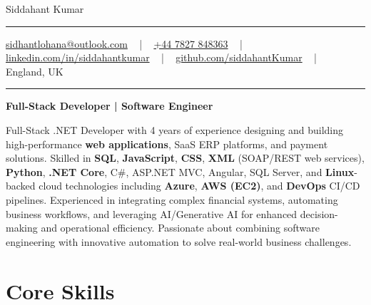 \documentclass[letterpaper,10pt]{article}
\newcommand{\documentTitle}[2]{
  \begin{center}
    \vspace*{-0.3in}
    {\Huge\color{accentTitle} #1}
    \vspace{8pt}
    {\color{accentLine} \hrule}
    \vspace{2pt}
    \footnotesize{#2}
    \vspace{2pt}
    {\color{accentLine} \hrule}
  \end{center}
}
\begin{document}
\documentTitle{Siddahant Kumar}{
\vspace{0.1cm}
\href{mailto:sidhantlohana@outlook.com}{sidhantlohana@outlook.com} ~ | ~
\href{tel:+447827848363}{+44 7827 848363} ~ | ~
\href{https://www.linkedin.com/in/siddahantkumar/}{linkedin.com/in/siddahantkumar} ~ | ~
\href{https://github.com/siddahantKumar}{github.com/siddahantKumar} ~ | ~
England, UK
}

\begin{center}
\textbf{Full-Stack Developer | Software Engineer}
\end{center}

Full-Stack .NET Developer with 4 years of experience designing and building high-performance \textbf{web applications}, SaaS ERP platforms, and payment solutions. Skilled in \textbf{SQL}, \textbf{JavaScript}, \textbf{CSS}, \textbf{XML} (SOAP/REST web services), \textbf{Python}, \textbf{.NET Core}, C\#, ASP.NET MVC, Angular, SQL Server, and \textbf{Linux}-backed cloud technologies including \textbf{Azure}, \textbf{AWS (EC2)}, and \textbf{DevOps} CI/CD pipelines. Experienced in integrating complex financial systems, automating business workflows, and leveraging AI/Generative AI for enhanced decision-making and operational efficiency. Passionate about combining software engineering with innovative automation to solve real-world business challenges.

\section{Core Skills}
\end{document}

